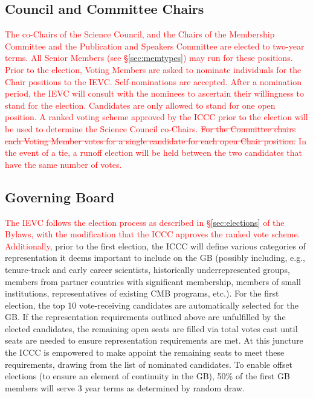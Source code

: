 \documentclass[12pt]{article}
\begin{document}
\subsection{Council and Committee Chairs}
\textcolor{red}{The co-Chairs of the Science Council, and the Chairs of the Membership Committee and the Publication and Speakers Committee are elected to two-year terms. All Senior Members (see \S\ref{sec:memtypes}) may  run for these positions.  Prior to the election, Voting Members are asked to nominate individuals for the Chair positions to the IEVC.   Self-nominations are accepted.
After a nomination period, the IEVC will consult with the nominees to ascertain their willingness to stand for the election. Candidates are only allowed to stand for one open position. 
A ranked voting scheme approved by the ICCC prior to the election will be used to determine the Science Council co-Chairs. \sout{For the Committee chairs each Voting Member votes for a single candidate for each open Chair position.} In the event of a tie, a runoff election will be held between the two candidates that have the same number of votes. }


\subsection{Governing Board}
\textcolor{red}{The IEVC follows the election process as described in \S\ref{sec:elections} of the Bylaws, with the modification that the ICCC approves the ranked vote scheme.  Additionally,} prior to the first election, the ICCC will define various categories of representation it deems important to include on the GB (possibly including, e.g., tenure-track and early career scientists,  historically underrepresented groups, members from partner countries with significant membership, members of small institutions, representatives of existing CMB programs, etc.). For the first election, the top 10 vote-receiving candidates are automatically selected for the GB. If the representation requirements outlined above are unfulfilled by the elected candidates, the remaining open seats are filled via total votes cast until seats are needed to ensure representation requirements are met. At this juncture the  ICCC is empowered to make appoint the remaining seats to meet these requirements, drawing from the list of nominated candidates. 
To enable offset elections (to ensure an element of continuity in the GB), 50\% of the first GB members will serve 3 year terms as determined by random draw. 
\end{document}
